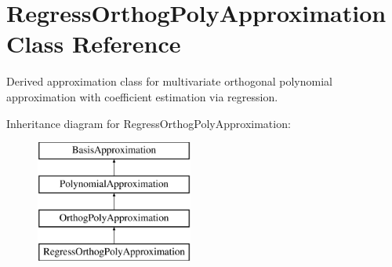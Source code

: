 \section{Regress\+Orthog\+Poly\+Approximation Class Reference}
\label{classPecos_1_1RegressOrthogPolyApproximation}


Derived approximation class for multivariate orthogonal polynomial approximation with coefficient estimation via regression.  


Inheritance diagram for Regress\+Orthog\+Poly\+Approximation\+:\begin{figure}[H]
\begin{center}
\leavevmode
\includegraphics[height=4.000000cm]{classPecos_1_1RegressOrthogPolyApproximation}
\end{center}
\end{figure}
